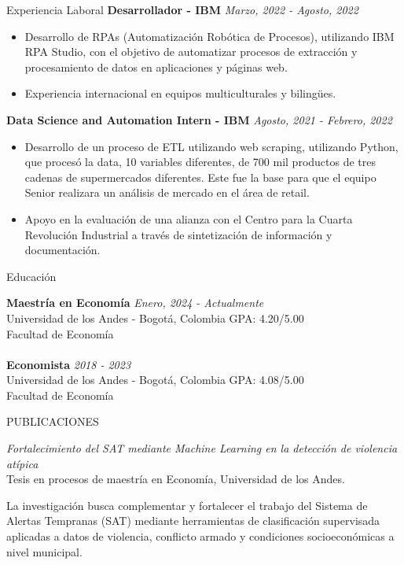 \documentclass{resume}
\begin{document}
\begin{rSection}{Experiencia Laboral}
{\bf Desarrollador - IBM} \hfill {\em Marzo, 2022 - Agosto, 2022} 
\begin{itemize}
    \item Desarrollo de RPAs (Automatización Robótica de Procesos), utilizando IBM RPA Studio, con el objetivo de automatizar procesos de extracción y procesamiento de datos  en aplicaciones y páginas web.
    \item Experiencia internacional en equipos multiculturales y bilingües.
\end{itemize}

{\bf Data Science and Automation Intern - IBM} \hfill {\em Agosto, 2021 - Febrero, 2022} 
\begin{itemize}
    \item Desarrollo de un proceso de ETL utilizando web scraping, utilizando Python, que procesó la data, 10 variables diferentes, de 700 mil productos de tres cadenas de supermercados diferentes. Este fue la base para que el equipo Senior realizara un análisis de mercado en el área de retail.
    \item Apoyo en la evaluación de una alianza con el Centro para la Cuarta Revolución Industrial a través de sintetización de información y documentación. 
\end{itemize}


\end{rSection}

\begin{rSection}{Educación}

{\bf Maestría en Economía} \hfill {\em Enero, 2024 - Actualmente} 
\\ Universidad de los Andes - Bogotá, Colombia \hfill 
{ GPA: 4.20/5.00}
\\ Facultad de Economía
\\
\\{\bf Economista} \hfill {\em 2018 - 2023} 
\\ Universidad de los Andes - Bogotá, Colombia \hfill { GPA: 4.08/5.00}
\\ Facultad de Economía
\end{rSection}

\begin{rSection}{PUBLICACIONES}

\textit{Fortalecimiento del SAT mediante Machine Learning en la detección de violencia atípica}
\\ \small{Tesis en procesos de maestría en Economía, Universidad de los Andes.}  
\vspace{-2mm}
\begin{tcolorbox}[colback=gray!5, colframe=black!20, boxrule=0.4pt, arc=2pt]
La investigación busca complementar y fortalecer el trabajo del Sistema de Alertas Tempranas (SAT) mediante herramientas de clasificación supervisada aplicadas a datos de violencia, conflicto armado y condiciones socioeconómicas a nivel municipal.
\end{tcolorbox}
\end{rSection}
\end{document}
